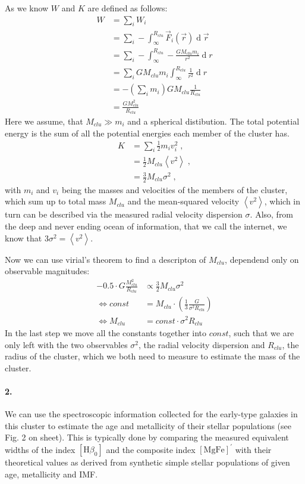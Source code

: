 \documentclass[11pt,a4paper,twoside]{article}
\newcommand{\op}[1]{\operatorname{#1}}
\newcommand{\MgFe}{\ensuremath{[\text{MgFe}]^\prime} }
\newcommand{\Hbo}{\ensuremath{[\text{H}\beta_0]} }
\begin{document}
As we know $W$ and $K$ are defined as follows:
\begin{align}
    W   &= \sum_i W_i \\
        &= \sum_i - \int_{\infty}^{R_{clu}} \vec{F}_i(\vec{r})\op{d}\vec{r} \\
        &= \sum_i - \int_{\infty}^{R_{clu}} -\frac{GM_{clu}m_i}{r^2}\op{d}r \\
        &= \sum_i GM_{clu}m_i\int_{\infty}^{R_{clu}} \frac{1}{r^2}\op{d}r \\
        &= -\left( \sum_im_i \right)GM_{clu} \frac{1}{R_{clu}}  \\
        &= \frac{GM_{clu}^2}{R_{clu}}
\end{align}
Here we assume, that $M_{clu} \gg m_i$ and a spherical distibution.
The total potential energy is the sum of all the potential energies each 
member of the cluster has.
\begin{align}
    K   &= \sum_i \frac{1}{2}m_iv_i^2\;,\\
        &= \frac{1}{2} M_{clu} \left< v^2\right> \;, \\
        &= \frac{3}{2} M_{clu} \sigma^2\;,
\end{align}
with $m_i$ and $v_i$ being the masses and velocities of the members of the
cluster, which sum up to total mass $M_{clu}$ and the mean-squared velocity
$\left< v^2 \right>$, which in turn can be described via the measured radial
velocity dispersion $\sigma$. Also, from the deep and never ending ocean of
information, that we call the internet, we know that 
$3\sigma^2 = \left<v^2\right>$.

Now we can use virial's theorem to find a descripton of $M_{clu}$, dependend
only on observable magnitudes:
\begin{align}
    -0.5\cdot G \frac{M_{clu}^2}{R_{clu}} &\propto \frac{3}{2} M_{clu} \sigma^2\\
    \Leftrightarrow const &= M_{clu} \cdot\left( \frac{1}{3}\frac{G}{\sigma^2 R_{clu}}\right) \\
    \Leftrightarrow M_{clu} &= const \cdot \sigma^2 R_{clu}
\end{align}
In the last step we move all the constants together into $const$, such that we
are only left with the two observables $\sigma^2$, the radial velocity dispersion
and $R_{clu}$, the radius of the cluster, which we both need
to measure to estimate the mass of the cluster.

\paragraph{2.} We can use the spectroscopic information collected for the 
early-type galaxies in this cluster to estimate the age and metallicity of 
their stellar populations (see Fig. 2 on sheet). This is typically done by comparing 
the measured equivalent widths of the index $\Hbo$ and the composite index 
$\MgFe$ with their theoretical values as derived from synthetic simple
stellar populations of given age, metallicity and IMF.\\
\end{document}
